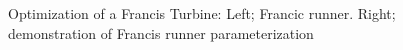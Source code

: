 \begin{figure}[h!]
\begin{minipage}[b]{0.5\linewidth}
 \centering
\end{minipage}
\begin{minipage}[b]{0.5\linewidth}
 \centering
\end{minipage}
\caption{Optimization of a Francis Turbine: Left; Francic runner. Right; demonstration of Francis runner parameterization}
\label{design-parameterization}
\end{figure}

